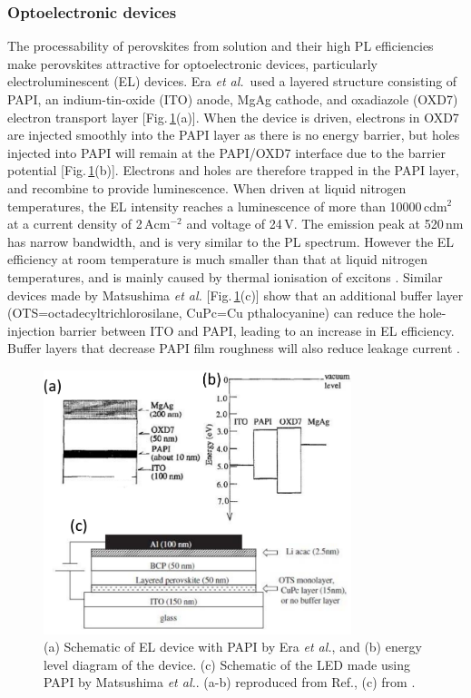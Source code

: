 \subsubsection{Optoelectronic devices}
The processability of perovskites from solution and their high PL efficiencies make perovskites attractive for optoelectronic devices, particularly electroluminescent (EL) devices. Era \textit{et al.}\ used a layered structure consisting of PAPI, an indium-tin-oxide (ITO) anode, MgAg cathode, and oxadiazole (OXD7) electron transport layer [Fig.\,\ref{2Fig22}(a)]. When the device is driven, electrons in OXD7 are injected smoothly into the PAPI layer as there is no energy barrier, but holes injected into PAPI will remain at the PAPI/OXD7 interface due to the barrier potential [Fig.\,\ref{2Fig22}(b)]. Electrons and holes are therefore trapped in the PAPI layer, and recombine to provide luminescence. When driven at liquid nitrogen temperatures, the EL intensity reaches a luminescence of more than 10000\,cd$\textrm{m}^2$ at a current density of 2\,A$\textrm{cm}^{-2}$ and voltage of 24\,V. The emission peak at 520\,nm has narrow bandwidth, and is very similar to the PL spectrum. However the EL efficiency at room temperature is much smaller than that at liquid nitrogen temperatures, and is mainly caused by thermal ionisation of excitons \cite{Era1994}. Similar devices made by Matsushima \textit{et al.} [Fig.\,\ref{2Fig22}(c)] show that an additional buffer layer (OTS=octadecyltrichlorosilane, CuPc=Cu pthalocyanine) can reduce the hole-injection barrier between ITO and PAPI, leading to an increase in EL efficiency. Buffer layers that decrease PAPI film roughness will also reduce leakage current \cite{Matsushima2005}.
\begin{figure}[h!]
\centering
\includegraphics[width=0.8\textwidth]{Fig22}
\caption{(a) Schematic of EL device with PAPI by Era \textit{et al.}, and (b) energy level diagram of the device. (c) Schematic of the LED made using PAPI by Matsushima \textit{et al.}. (a-b) reproduced from Ref.\cite{Era1994}, (c) from \cite{Matsushima2005}.}
\label{2Fig22}
\end{figure}

